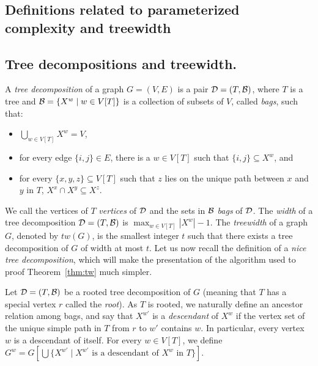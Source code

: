 \documentclass[12pt]{article}
\begin{document}
\begin{appendix}


\section{Definitions related to parameterized complexity and treewidth}
\label{app:fptandtw}

\subsection{Tree decompositions and treewidth.}
\label{app:tw}

A \emph{tree decomposition} of a graph $G=(V,E)$ is a pair ${\cal D}=(T,{\cal B})$, where $T$ is a tree
and ${\cal B}=\{X^{w}\mid w\in V[T]\}$ is a collection of subsets of $V$, called \emph{bags},
such that:
%
\begin{itemize}
\item $\bigcup_{w \in V[T]} X^w = V$,
\item for every edge $\{i,j\} \in E$, there is a $w \in V[T]$ such that $\{i, j\} \subseteq X^w$, and
\item for every $\{x,y,z\} \subseteq V[T]$ such that $z$ lies on the unique path between $x$ and $y$ in $T$,  $X^x \cap X^y \subseteq X^z$.
\end{itemize}
We call the vertices of $T$ {\em vertices} of ${\cal D}$ and the sets in ${\cal B}$ {\em bags} of ${\cal D}$. The \emph{width} of a  tree decomposition ${\cal D}=(T,{\cal B})$ is $\max_{w \in V[T]} |X^w| - 1$.
The \emph{treewidth} of a graph $G$, denoted by $tw(G)$, is the smallest integer $t$ such that there exists a tree decomposition of $G$ of width at most $t$.
Let us now recall the definition of a \emph{nice tree decomposition}, which will make the presentation of the algorithm used to proof Theorem~\ref{thm:tw} much simpler.

Let ${\cal D}=(T,{\cal B})$
be a rooted tree decomposition of $G$ (meaning that $T$ has a special vertex $r$ called the \emph{root}).
As $T$ is rooted, we naturally define an ancestor relation among bags, and say that $X^{w'}$ is a \emph{descendant} of $X^w$ if the vertex set of the unique simple path in $T$ from $r$ to $w'$ contains
$w$. In particular, every vertex $w$ is a descendant of itself.
For every $w \in V[T]$, we define $G^w=G[\bigcup\{X^{w'}\mid X^{w'}\text{ is a descendant of }X^w\text{ in }T\}]$.


\end{appendix}
\end{document}
